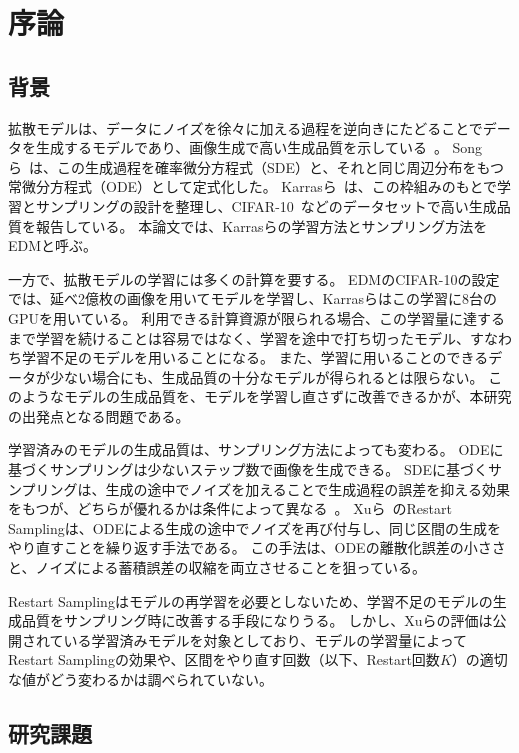 \chapter{序論}
\label{chap:intro}

\section{背景}
\label{sec:intro-background}

拡散モデルは、データにノイズを徐々に加える過程を逆向きにたどることでデータを生成するモデルであり、画像生成で高い生成品質を示している~\cite{ho2020ddpm}。
Songら~\cite{song2021sde}は、この生成過程を確率微分方程式（SDE）と、それと同じ周辺分布をもつ常微分方程式（ODE）として定式化した。
Karrasら~\cite{karras2022edm}は、この枠組みのもとで学習とサンプリングの設計を整理し、CIFAR-10~\cite{krizhevsky2009cifar}などのデータセットで高い生成品質を報告している。
本論文では、Karrasらの学習方法とサンプリング方法をEDMと呼ぶ。

一方で、拡散モデルの学習には多くの計算を要する。
EDMのCIFAR-10の設定では、延べ2億枚の画像を用いてモデルを学習し、Karrasらはこの学習に8台のGPUを用いている。
利用できる計算資源が限られる場合、この学習量に達するまで学習を続けることは容易ではなく、学習を途中で打ち切ったモデル、すなわち学習不足のモデルを用いることになる。
また、学習に用いることのできるデータが少ない場合にも、生成品質の十分なモデルが得られるとは限らない。
このようなモデルの生成品質を、モデルを学習し直さずに改善できるかが、本研究の出発点となる問題である。

学習済みのモデルの生成品質は、サンプリング方法によっても変わる。
ODEに基づくサンプリングは少ないステップ数で画像を生成できる。
SDEに基づくサンプリングは、生成の途中でノイズを加えることで生成過程の誤差を抑える効果をもつが、どちらが優れるかは条件によって異なる~\cite{karras2022edm,cao2023odesde}。
Xuら~\cite{xu2023restart}のRestart Samplingは、ODEによる生成の途中でノイズを再び付与し、同じ区間の生成をやり直すことを繰り返す手法である。
この手法は、ODEの離散化誤差の小ささと、ノイズによる蓄積誤差の収縮を両立させることを狙っている。

Restart Samplingはモデルの再学習を必要としないため、学習不足のモデルの生成品質をサンプリング時に改善する手段になりうる。
しかし、Xuらの評価は公開されている学習済みモデルを対象としており、モデルの学習量によってRestart Samplingの効果や、区間をやり直す回数（以下、Restart回数$K$）の適切な値がどう変わるかは調べられていない。

\section{研究課題}
\label{sec:intro-rq}

